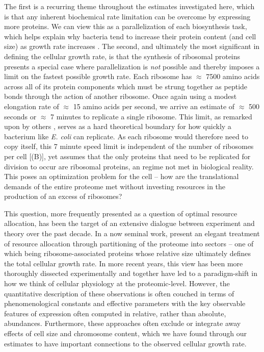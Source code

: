 The first is a recurring theme throughout the estimates investigated here, which
is that any inherent biochemical rate limitation can be overcome by expressing
more proteins. We can view this as a parallelization of each biosynthesis task,
which helps explain why bacteria tend to increase their protein content (and
cell size) as growth rate increases \citep{ojkic2019}. The second, and
ultimately the most significant in defining the cellular growth rate, is that
the synthesis of ribosomal proteins presents a special case where
parallelization is \textit{not} possible and thereby imposes a limit on the
fastest possible growth rate. Each ribosome has $\approx$ 7500 amino acids
across all of its protein components which must be strung together as peptide
bonds through the action of another ribosome. Once again using a modest
elongation rate of $\approx$ 15 amino acids per second, we arrive an estimate of
$\approx$ 500 seconds or $\approx$ 7 minutes to replicate a single ribosome.
This limit, as remarked upon by others \citep{dill2011}, serves as a hard
theoretical boundary for how quickly a bacterium like \textit{E. coli} can
replicate. As each ribosome would therefore need to copy itself, this 7 minute
speed limit is independent of the number of ribosomes per cell
[(B)], yet assumes that the only proteins that need to be
replicated for division to occur are ribosomal proteins, an regime
not met in biological reality. This poses an optimization problem for the cell
-- how are the translational demands of the entire proteome met without
investing resources in the production of an excess of ribosomes?

This question, more frequently presented as a question of optimal resource
allocation, has been the target of an extensive dialogue between experiment and
theory over the past decade. In a now seminal work,
\cite{scott2010} present an elegant treatment of resource allocation through
partitioning of the proteome into sectors -- one of which being
ribosome-associated proteins whose relative size ultimately defines
the total cellular growth rate. In more recent years, this view has been more
thoroughly dissected experimentally
\citep{klumpp2014,basan2015,dai2018, dai2016, erickson2017} and together
have led to a paradigm-shift in how we think of cellular physiology at the
proteomic-level. However, the quantitative description of these  observations is
often couched in terms of phenomenological constants and effective parameters
with the key observable features of expression often computed in relative, rather
than absolute, abundances. Furthermore, these approaches often exclude or
integrate away effects of cell size and chromosome content, which we have
found through our estimates to have important connections to the observed cellular
growth rate.

